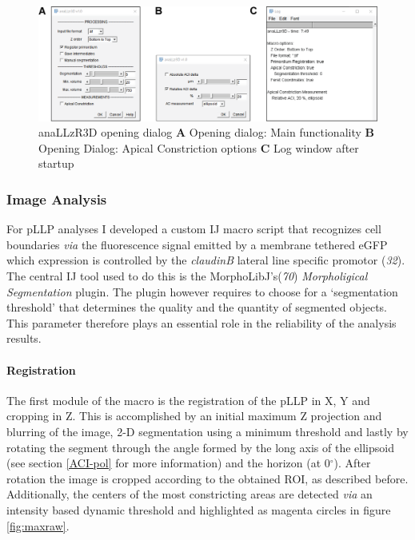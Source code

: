 \documentclass[10pt, b5paper, singlespacinge, twoside]{reedthesis} %
\theoremstyle{definition}
\theoremstyle{definition}
\theoremstyle{definition}
\theoremstyle{remark}
\begin{document}
\begin{figure}[H]

{\centering \includegraphics[width=0.95\linewidth]{figures/materials/macros/anallzr3D_macro} 

}

\caption[anaLLzR3D opening dialog]{anaLLzR3D opening dialog \textbf{A} Opening dialog: Main functionality \textbf{B} Opening Dialog: Apical Constriction options \textbf{C} Log window after startup}\label{fig:anallzr3ddialog}
\end{figure}
\hypertarget{image-analysis-1}{%
\subsubsection{Image Analysis}\label{image-analysis-1}}

For pLLP analyses I developed a custom IJ macro script that recognizes cell boundaries \emph{via} the fluorescence signal emitted by a membrane tethered eGFP which expression is controlled by the \emph{claudinB} lateral line specific promotor (\emph{32}). The central IJ tool used to do this is the MorphoLibJ's(\emph{70}) \emph{Morpholigical Segmentation} plugin. The plugin however requires to choose for a `segmentation threshold' that determines the quality and the quantity of segmented objects. This parameter therefore plays an essential role in the reliability of the analysis results.

\hypertarget{registration-1}{%
\paragraph{Registration}\label{registration-1}}

The first module of the macro is the registration of the pLLP in X, Y and cropping in Z. This is accomplished by an initial maximum Z projection and blurring of the image, 2-D segmentation using a minimum threshold and lastly by rotating the segment through the angle formed by the long axis of the ellipsoid (see section \ref{ACI-pol} for more information) and the horizon (at 0\(^{\circ}\)). After rotation the image is cropped according to the obtained ROI, as described before. Additionally, the centers of the most constricting areas are detected \emph{via} an intensity based dynamic threshold and highlighted as magenta circles in figure \ref{fig:maxraw}.
\end{document}
